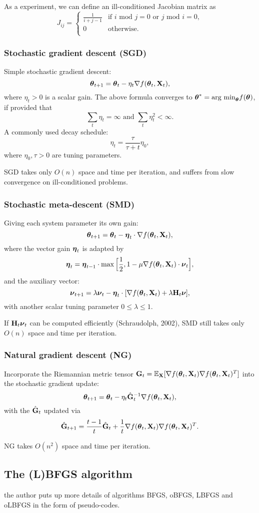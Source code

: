 As a experiment, we can define an ill-conditioned Jacobian matrix as
\begin{equation*}
J_{ij}=\left\{
  \begin{array}{cl}
    \frac{1}{i+j-1} & \text{if }i\text{ mod }j=0\text{ or }j\text{ mod }i=0, \\
    0 & \text{otherwise}. \\
  \end{array}
\right.
\end{equation*}

\subsubsection{Stochastic gradient descent (SGD)}
Simple stochastic gradient descent:
\[ \boldsymbol{\theta}_{t+1}=\boldsymbol{\theta}_t-\eta_t\nabla f(\boldsymbol{\theta}_t,\mathbf{X}_t), \]
where $\eta_t>0$ is a scalar gain.
The above formula converges to $\boldsymbol{\theta}^*=\text{arg min}_{\boldsymbol{\theta}} f(\boldsymbol{\theta})$,
if provided that
\[ \sum_t\eta_t=\infty\text{ and } \sum_t\eta_t^2<\infty. \]
A commonly used decay schedule:
\[ \eta_t=\frac{\tau}{\tau+t}\eta_0, \]
where $\eta_0,\tau>0$ are tuning parameters.

SGD takes only $O(n)$ space and time per iteration,
and suffers from slow convergence on ill-conditioned problems.

\subsubsection{Stochastic meta-descent (SMD)}
Giving each system parameter its own gain:
\[ \boldsymbol{\theta}_{t+1}=\boldsymbol{\theta}_t-\boldsymbol{\eta}_t\cdot\nabla f(\boldsymbol{\theta}_t,\mathbf{X}_t), \]
where the vector gain $\boldsymbol{\eta}_t$ is adapted by
\[ \boldsymbol{\eta}_t=\boldsymbol{\eta}_{t-1}\cdot\max\Big[\frac{1}{2},1-\mu\nabla f(\boldsymbol{\theta}_t,\mathbf{X}_t)\cdot\boldsymbol{\nu}_t\Big], \]
and the auxiliary vector:
\[ \boldsymbol{\nu}_{t+1}=\lambda\boldsymbol{\nu}_t-\boldsymbol{\eta}_t\cdot[\nabla f(\boldsymbol{\theta}_t,\mathbf{X}_t)+\lambda\mathbf{H}_t\boldsymbol{\nu}], \]
with another scalar tuning parameter $0\leqslant\lambda\leqslant1$.

If $\mathbf{H}_t\boldsymbol{\nu}_t$ can be computed efficiently (Schraudolph, 2002),
SMD still takes only $O(n)$ space and time per iteration.

\subsubsection{Natural gradient descent (NG)}
Incorporate the Riemannian metric tensor
$\mathbf{G}_t=\mathbb{E}_{\mathbf{X}}[\nabla f(\boldsymbol{\theta}_t,\mathbf{X}_t)\nabla f(\boldsymbol{\theta}_t,\mathbf{X}_t)^T]$
into the stochastic gradient update:
\[ \boldsymbol{\theta}_{t+1}=\boldsymbol{\theta}_t-\eta_t\hat{\mathbf{G}}_t^{-1}\nabla f(\boldsymbol{\theta}_t,\mathbf{X}_t), \]
with the $\hat{\mathbf{G}}_t$ updated via
\[ \hat{\mathbf{G}}_{t+1}=\frac{t-1}{t}\hat{\mathbf{G}}_t+\frac{1}{t}\nabla f(\boldsymbol{\theta}_t,\mathbf{X}_t)\nabla f(\boldsymbol{\theta}_t,\mathbf{X}_t)^T. \]

NG takes $O(n^2)$ space and time per iteration.

\subsection{The (L)BFGS algorithm}
 the author puts up more details of algorithms
BFGS, oBFGS, LBFGS and oLBFGS in the form of pseudo-codes.

